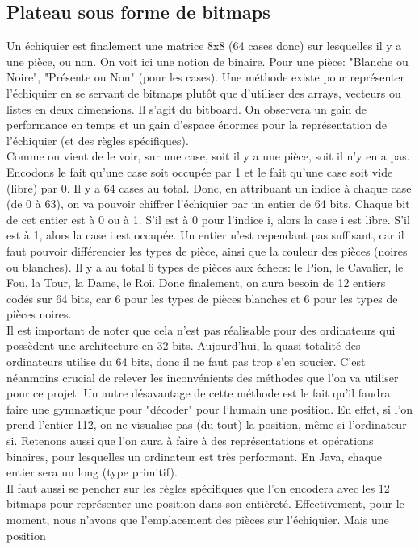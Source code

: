 \documentclass{article}
\begin{document}
\subsection{Plateau sous forme de bitmaps}
Un échiquier est finalement une matrice 8x8 (64 cases donc) sur lesquelles il y a une pièce, ou non. On voit ici une
notion de binaire. Pour une pièce: "Blanche ou Noire", "Présente ou Non" (pour les cases). Une méthode existe pour
représenter l'échiquier en se servant de bitmaps plutôt que d'utiliser des arrays, vecteurs ou listes en deux dimensions.
Il s'agit du bitboard. On observera un gain de performance en temps et un gain d'espace énormes pour la représentation
de l'échiquier (et des règles spécifiques).\\
Comme on vient de le voir, sur une case, soit il y a une pièce, soit il n'y en a pas.
Encodons le fait qu'une case soit occupée par 1 et le fait qu'une case soit vide (libre) par 0. Il y a 64 cases au total.
Donc, en attribuant un indice à chaque case (de 0 à 63), on va pouvoir chiffrer l'échiquier par un entier de 64 bits.
Chaque bit de cet entier est à 0 ou à 1. S'il est à 0 pour l'indice i, alors la case i est libre. S'il est à 1, alors la
case i est occupée. Un entier n'est cependant pas suffisant, car il faut pouvoir différencier les types de pièce, ainsi
que la couleur des pièces (noires ou blanches). Il y a au total 6 types de pièces aux échecs: le Pion, le Cavalier, le Fou,
la Tour, la Dame, le Roi. Donc finalement, on aura besoin de 12 entiers codés sur 64 bits, car 6 pour les types de pièces
blanches et 6 pour les types de pièces noires.
\\Il est important de noter que cela n'est pas réalisable pour des ordinateurs qui possèdent une architecture en 32 bits.
Aujourd'hui, la quasi-totalité des ordinateurs utilise du 64 bits, donc il ne faut pas trop s'en soucier. C'est néanmoins
crucial de relever les inconvénients des méthodes que l'on va utiliser pour ce projet. Un autre désavantage de cette méthode
est le fait qu'il faudra faire une gymnastique pour "décoder" pour l'humain une position. En effet, si l'on prend l'entier
112, on ne visualise pas (du tout) la position, même si l'ordinateur si.
Retenons aussi que l'on aura à faire à des représentations et opérations binaires, pour lesquelles un ordinateur est très
performant. En Java, chaque entier sera un long (type primitif).
\\Il faut aussi se pencher sur les règles spécifiques que l'on encodera avec les 12 bitmaps pour représenter une position
dans son entièreté. Effectivement, pour le moment, nous n'avons que l'emplacement des pièces sur l'échiquier. Mais une position
\end{document}
